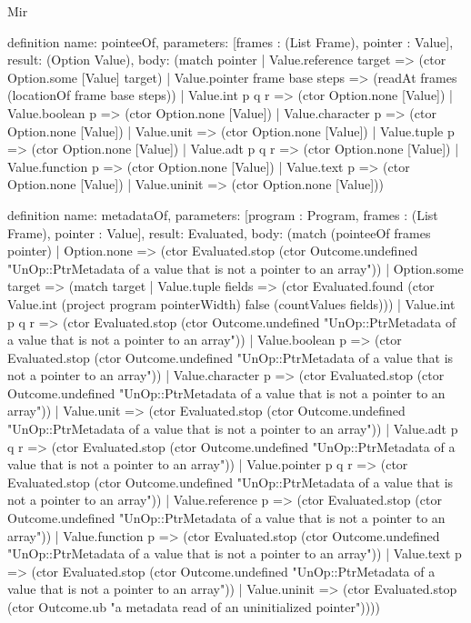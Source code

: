\begin{lexlean}{Mir}
\begin{semanticmodule}
definition{
  name: pointeeOf,
  parameters: [frames : (List Frame), pointer : Value],
  result: (Option Value),
  body: (match pointer
    | Value.reference target => (ctor Option.some [Value] target)
    | Value.pointer frame base steps => (readAt frames (locationOf frame base steps))
    | Value.int p q r => (ctor Option.none [Value])
    | Value.boolean p => (ctor Option.none [Value])
    | Value.character p => (ctor Option.none [Value])
    | Value.unit => (ctor Option.none [Value])
    | Value.tuple p => (ctor Option.none [Value])
    | Value.adt p q r => (ctor Option.none [Value])
    | Value.function p => (ctor Option.none [Value])
    | Value.text p => (ctor Option.none [Value])
    | Value.uninit => (ctor Option.none [Value]))
}

definition{
  name: metadataOf,
  parameters: [program : Program, frames : (List Frame), pointer : Value],
  result: Evaluated,
  body: (match (pointeeOf frames pointer)
    | Option.none => (ctor Evaluated.stop (ctor Outcome.undefined "UnOp::PtrMetadata of a value that is not a pointer to an array"))
    | Option.some target => (match target
      | Value.tuple fields => (ctor Evaluated.found (ctor Value.int (project program pointerWidth) false (countValues fields)))
      | Value.int p q r => (ctor Evaluated.stop (ctor Outcome.undefined "UnOp::PtrMetadata of a value that is not a pointer to an array"))
      | Value.boolean p => (ctor Evaluated.stop (ctor Outcome.undefined "UnOp::PtrMetadata of a value that is not a pointer to an array"))
      | Value.character p => (ctor Evaluated.stop (ctor Outcome.undefined "UnOp::PtrMetadata of a value that is not a pointer to an array"))
      | Value.unit => (ctor Evaluated.stop (ctor Outcome.undefined "UnOp::PtrMetadata of a value that is not a pointer to an array"))
      | Value.adt p q r => (ctor Evaluated.stop (ctor Outcome.undefined "UnOp::PtrMetadata of a value that is not a pointer to an array"))
      | Value.pointer p q r => (ctor Evaluated.stop (ctor Outcome.undefined "UnOp::PtrMetadata of a value that is not a pointer to an array"))
      | Value.reference p => (ctor Evaluated.stop (ctor Outcome.undefined "UnOp::PtrMetadata of a value that is not a pointer to an array"))
      | Value.function p => (ctor Evaluated.stop (ctor Outcome.undefined "UnOp::PtrMetadata of a value that is not a pointer to an array"))
      | Value.text p => (ctor Evaluated.stop (ctor Outcome.undefined "UnOp::PtrMetadata of a value that is not a pointer to an array"))
      | Value.uninit => (ctor Evaluated.stop (ctor Outcome.ub "a metadata read of an uninitialized pointer"))))
}


\end{semanticmodule}
\end{lexlean}
